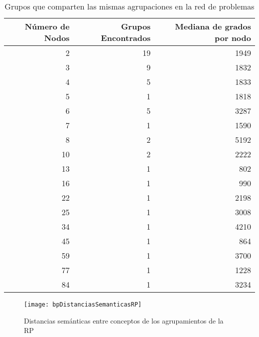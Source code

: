 \begin{table}[htb]
\centering
\caption{Grupos que comparten las mismas agrupaciones en la red de problemas}
\label{gruposRP}
\begin{tabular}{@{}rrr@{}}
\toprule
Número de Nodos & Grupos Encontrados & Mediana de grados por nodo \\ \midrule
2               & 19                 & 1949                       \\
3               & 9                  & 1832                       \\
4               & 5                  & 1833                       \\
5               & 1                  & 1818                       \\
6               & 5                  & 3287                       \\
7               & 1                  & 1590                       \\
8               & 2                  & 5192                       \\
10              & 2                  & 2222                       \\
13              & 1                  & 802                        \\
16              & 1                  & 990                        \\
22              & 1                  & 2198                       \\
25              & 1                  & 3008                       \\
34              & 1                  & 4210                       \\
45              & 1                  & 864                        \\
59              & 1                  & 3700                       \\
77              & 1                  & 1228                       \\
84              & 1                  & 3234                       \\ \bottomrule
\end{tabular}
\end{table}

\begin{figure}[ht]
\caption{Distancias semánticas entre conceptos de los agrupamientos de la \acrshort{RP}}
\label{fig:bpDistanciasSemanticasRP}
\centering
\texttt{[image: bpDistanciasSemanticasRP]}
\end{figure}

